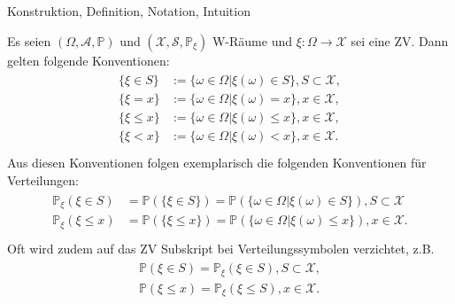 \documentclass[
  8pt,
  ignorenonframetext,
]{beamer}
\begin{document}
\begin{frame}{Konstruktion, Definition, Notation, Intuition}
\protect\hypertarget{konstruktion-definition-notation-intuition-5}{}
\small
\begin{definition}
\justifying
Es seien $(\Omega,\mathcal{A},\mathbb{P})$ und $(\mathcal{X},\mathcal{S},\mathbb{P}_\xi)$
W-Räume und $\xi : \Omega \to \mathcal{X}$ sei eine ZV. Dann gelten folgende Konventionen:
\begin{align*}
\begin{split}
\{\xi \in S\} & := \{\omega \in \Omega|\xi(\omega) \in S\}, S \subset \mathcal{X},  \\
\{\xi  =  x\} & := \{\omega \in \Omega|\xi(\omega)  =  x\}, x \in     \mathcal{X},  \\
\{\xi \le x\} & := \{\omega \in \Omega|\xi(\omega) \le x\}, x \in     \mathcal{X},  \\
\{\xi  <  x\} & := \{\omega \in \Omega|\xi(\omega)  <  x\}, x \in     \mathcal{X}.  \\
\end{split}
\end{align*}
Aus diesen Konventionen folgen exemplarisch die folgenden Konventionen für Verteilungen:
\begin{align*}
\begin{split}
\mathbb{P}_\xi\left(\xi \in S\right)
& = \mathbb{P}\left(\{\xi \in S\} \right)
  = \mathbb{P}\left( \{\omega \in \Omega|\xi(\omega) \in S\} \right), S \subset\mathcal{X}  \\
\mathbb{P}_\xi\left(\xi \le x \right)
& = \mathbb{P}\left(\{\xi \le x\} \right)
  = \mathbb{P}\left( \{\omega \in \Omega|\xi(\omega) \le x\} \right), x \in \mathcal{X}.  \\
\end{split}
\end{align*}
Oft wird zudem auf das ZV Subskript bei Verteilungssymbolen verzichtet, z.B.
\begin{align*}
\begin{split}
\mathbb{P}\left(\xi\in S\right) = \mathbb{P}_\xi\left(\xi \in S\right), S \subset \mathcal{X} , \\
\mathbb{P}\left(\xi\le x\right) = \mathbb{P}_\xi\left(\xi \le S\right), x \in \mathcal{X}.          \\
\end{split}
\end{align*}
\end{definition}
\end{frame}
\end{document}

